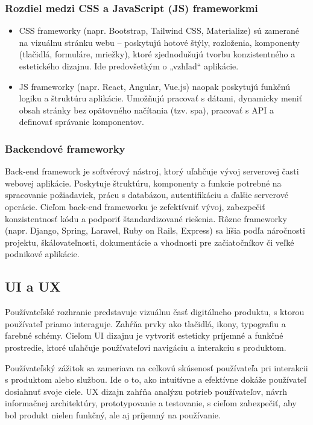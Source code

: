   \subsubsection{Rozdiel medzi CSS a JavaScript (JS) frameworkmi}
  \begin{itemize}
  \item CSS frameworky (napr. Bootstrap, Tailwind CSS, Materialize) sú zamerané na vizuálnu stránku webu – poskytujú hotové štýly, rozloženia, komponenty (tlačidlá, formuláre, mriežky), ktoré zjednodušujú tvorbu konzistentného a estetického dizajnu. Ide predovšetkým o „vzhľad“ aplikácie.
  \item JS frameworky (napr. React, Angular, Vue.js) naopak poskytujú funkčnú logiku a štruktúru aplikácie. 
  Umožňujú pracovať s dátami, dynamicky meniť obsah stránky bez opätovného načítania (tzv. \acrshort{spa}), pracovať s API a definovať správanie komponentov.\cite{feframework}
\end{itemize}
\subsubsection{Backendové frameworky}
Back-end framework je softvérový nástroj, ktorý uľahčuje vývoj serverovej časti webovej aplikácie. 
Poskytuje štruktúru, komponenty a funkcie potrebné na spracovanie požiadaviek, prácu s databázou, autentifikáciu a ďalšie serverové operácie. 
Cieľom back-end frameworku je zefektívniť vývoj, zabezpečiť konzistentnosť kódu a podporiť štandardizované riešenia. 
Rôzne frameworky (napr. Django, Spring, Laravel, Ruby on Rails, Express) sa líšia podľa náročnosti projektu, škálovateľnosti, dokumentácie a vhodnosti pre začiatočníkov či veľké podnikové aplikácie.\cite{backendframework}

\subsection{UI a UX}
Používateľské rozhranie predstavuje vizuálnu časť digitálneho produktu, s ktorou používateľ priamo interaguje. 
Zahŕňa prvky ako tlačidlá, ikony, typografiu a farebné schémy. 
Cieľom UI dizajnu je vytvoriť esteticky príjemné a funkčné prostredie, ktoré uľahčuje používateľovi navigáciu a interakciu s produktom.

Používateľský zážitok sa zameriava na celkovú skúsenosť používateľa pri interakcii s produktom alebo službou. 
Ide o to, ako intuitívne a efektívne dokáže používateľ dosiahnuť svoje ciele. 
UX dizajn zahŕňa analýzu potrieb používateľov, návrh informačnej architektúry, prototypovanie a testovanie, s cieľom zabezpečiť, aby bol produkt nielen funkčný, ale aj príjemný na používanie.

